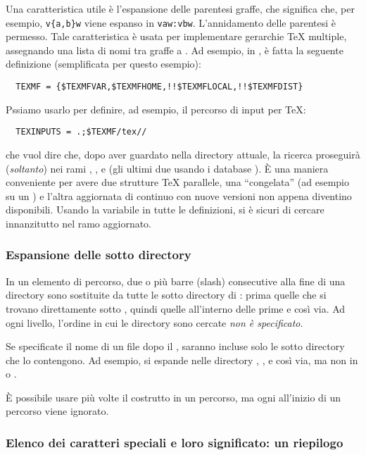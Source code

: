 \documentclass{article}
\begin{document}
Una caratteristica utile è l'espansione delle parentesi graffe, che
significa che, per esempio, \verb+v{a,b}w+ viene espanso in
\verb+vaw:vbw+. L'annidamento delle parentesi è permesso. Tale
caratteristica è usata per implementare gerarchie \TeX{} multiple,
assegnando una lista di nomi tra graffe a . Ad esempio, in
, è fatta la seguente definizione (semplificata per questo
esempio):
\begin{verbatim}
  TEXMF = {$TEXMFVAR,$TEXMFHOME,!!$TEXMFLOCAL,!!$TEXMFDIST}
\end{verbatim}
Pssiamo usarlo per definire, ad esempio, il percorso di input per \TeX:
\begin{verbatim}
  TEXINPUTS = .;$TEXMF/tex//
\end{verbatim}
che vuol dire che, dopo aver guardato nella directory attuale, la ricerca
proseguirà (\emph{soltanto}) nei rami ,
,  e 
(gli ultimi due usando i database ). È una maniera conveniente
per avere due strutture \TeX{} parallele, una ``congelata'' (ad
esempio su un \CD) e l'altra aggiornata di continuo con nuove versioni non
appena diventino disponibili. Usando la variabile  in tutte
le definizioni, si è sicuri di cercare innanzitutto nel ramo
aggiornato.

\subsubsection{Espansione delle sotto directory}
\label{sec:subdirectory-expansion}

In un elemento di percorso, due o più barre (slash) consecutive alla fine
di una directory  sono sostituite da tutte le sotto directory di
: prima quelle che si trovano direttamente sotto , quindi
quelle all'interno delle prime e così via. Ad ogni livello, l'ordine in
cui le directory sono cercate \emph{non è specificato}.

Se specificate il nome di un file dopo il \samp{//}, saranno incluse solo
le sotto directory che lo contengono. Ad esempio,  si
espande nelle directory , ,  e
così via, ma non in  o .

È possibile usare più volte il costrutto \samp{//} in un percorso, ma ogni
\samp{//} all'inizio di un percorso viene ignorato.

\subsubsection{Elenco dei caratteri speciali e loro significato: un
  riepilogo}
\end{document}
